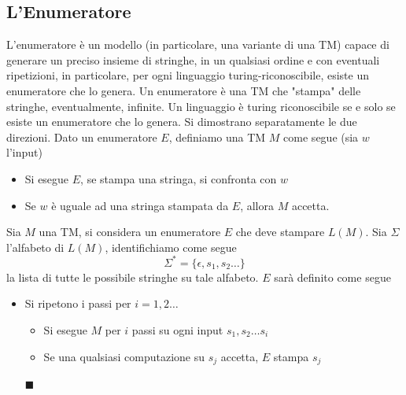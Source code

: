 \documentclass[10pt, letterpaper]{report}
\begin{document}
 \subsection{L'Enumeratore}
 L'enumeratore è un modello (in particolare, una variante di una TM) capace di generare un preciso insieme di stringhe, in un qualsiasi ordine e con eventuali ripetizioni, in particolare, per ogni linguaggio turing-riconoscibile, esiste un enumeratore che lo genera.\acc
Un enumeratore è una TM che "stampa" delle stringhe, eventualmente, infinite.\acc 
\teo{} Un linguaggio è turing riconoscibile se e solo se esiste un enumeratore che lo genera.\acc 
\dimo{} Si dimostrano separatamente le due direzioni.\acc 
\boxedMath{$\impliedby$} Dato un enumeratore $E$, definiamo una TM $M$ come segue (sia $w$ l'input)\begin{itemize}
    \item Si esegue $E$, se stampa una stringa, si confronta con $w$
    \item Se $w$ è uguale ad una stringa stampata da $E$, allora $M$ accetta.
\end{itemize}
\boxedMath{$\implies$} Sia $M$ una TM, si considera un enumeratore $E$ che deve 
stampare $L(M)$. Sia $\Sigma$ l'alfabeto di 
$L(M)$, identifichiamo come segue 
$$ \Sigma^*=\{\epsilon,s_1,s_2\dots\}$$
la lista di tutte le possibile stringhe su tale alfabeto. $E$ sarà definito come segue 
\begin{itemize}
    \item Si ripetono i passi per $i=1,2\dots$\begin{itemize}
        \item Si esegue $M$ per $i$ passi su ogni input $s_1,s_2\dots s_i$
        \item Se una qualsiasi computazione su $s_j$ accetta, $E$ stampa 
        $s_j$
    \end{itemize}
\hfill$\blacksquare$\end{itemize}\flowerLine 
\end{document}
